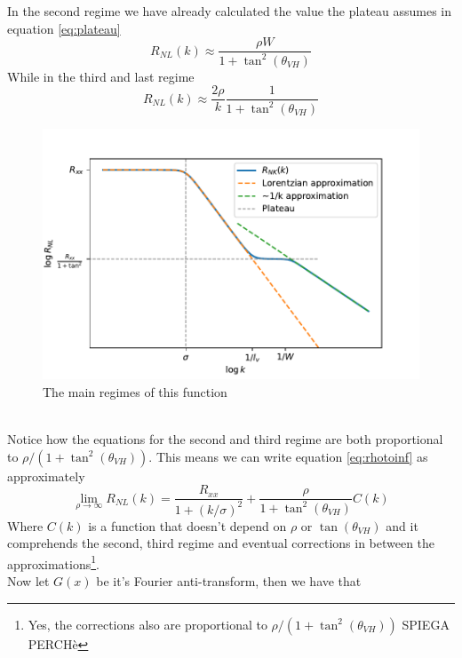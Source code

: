 In the second regime we have already calculated the value the plateau assumes in equation \ref{eq:plateau} 
\begin{equation}
    R_{NL}(k)\approx \frac{\rho W}{1+\tan^2(\theta_{VH})}
    \label{eq:second_regime}
\end{equation}
While in the third and last regime 
\begin{equation}
    R_{NL}(k)\approx \frac{2\rho}k \frac 1{1+\tan^2(\theta_{VH})}
    \label{eq:third_regime}
\end{equation}
\begin{figure}[h!]
    \centering
    \includegraphics[width=\linewidth]{Immagini/rnl/rho3.pdf}
    \caption{The main regimes of this function}
    \label{fig:rho3}
\end{figure}\\
Notice how the equations for the second and third regime are both proportional to $\rho/(1+\tan^2(\theta_{VH}))$. This means we can write equation \ref{eq:rhotoinf} as approximately
\begin{equation}
    \lim_{\rho\to\infty} R_{NL}(k)=\frac{R_{xx}}{1+(k/\sigma)^2} + \frac \rho{1+\tan^2(\theta_{VH})}C(k)
    \label{eq:rhotoinf2}
\end{equation}
Where $C(k)$ is a function that doesn't depend on $\rho$ or $\tan(\theta_{VH})$ and it comprehends the second, third regime and eventual corrections in between the approximations\footnote{Yes, the corrections also are proportional to $\rho/(1+\tan^2(\theta_{VH}))$ SPIEGA PERCHè}.\\
Now let $G(x)$ be it's Fourier anti-transform, then we have that 

